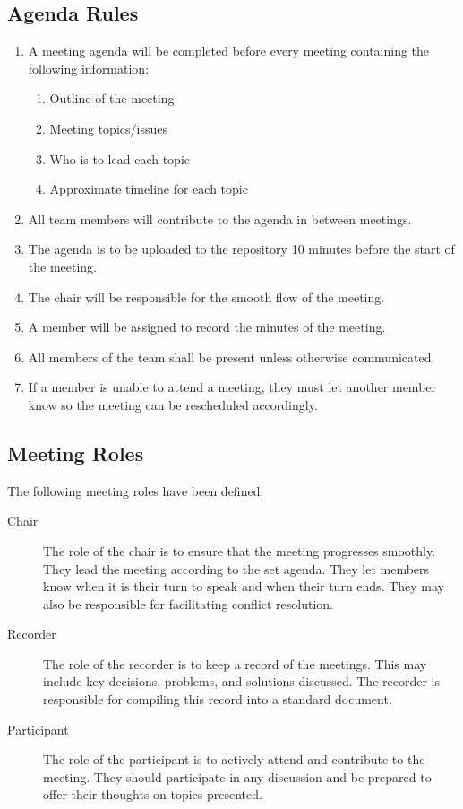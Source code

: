 \documentclass{article}
\begin{document}
	\subsection{Agenda Rules}
	\begin{enumerate}
		\item A meeting agenda will be completed before every meeting 
		containing 
		the 
		following information:
		\begin{enumerate}
			\item Outline of the meeting
			\item Meeting topics/issues
			\item Who is to lead each topic
			\item Approximate timeline for each topic
		\end{enumerate}
		\item All team members will contribute to the agenda in between 
		meetings.
		\item The agenda is to be uploaded to the repository 10 minutes before 
		the start of the meeting.
		\item The chair will be responsible for the smooth flow of the meeting.
		\item A member will be assigned to record the minutes of the meeting.
		\item All members of the team shall be present unless otherwise 	
		communicated.
		\item If a member is unable to attend a meeting, they must let another 
		member know so the meeting can be rescheduled accordingly.
	\end{enumerate}
	\subsection{Meeting Roles}
	The following meeting roles have been defined:
	\begin{description}
		\item[Chair] The role of the chair is to ensure that the meeting 
		progresses 
		smoothly. They lead the meeting according to the set agenda. 
		They 
		let members know when it is their turn to speak 
		and when their turn ends. They may also be responsible for facilitating 
		conflict resolution.
		\item[Recorder] The role of the recorder is to keep a record of the 
		meetings. This may include key decisions, problems, and solutions 
		discussed. The recorder is responsible for compiling this record into a 
		standard document.
		\item[Participant] The role of the participant is to actively attend 
		and 
		contribute to the meeting. They should participate in any discussion 
		and be 
		prepared to offer their thoughts on topics presented. 
	\end{description}
	
\end{document}
